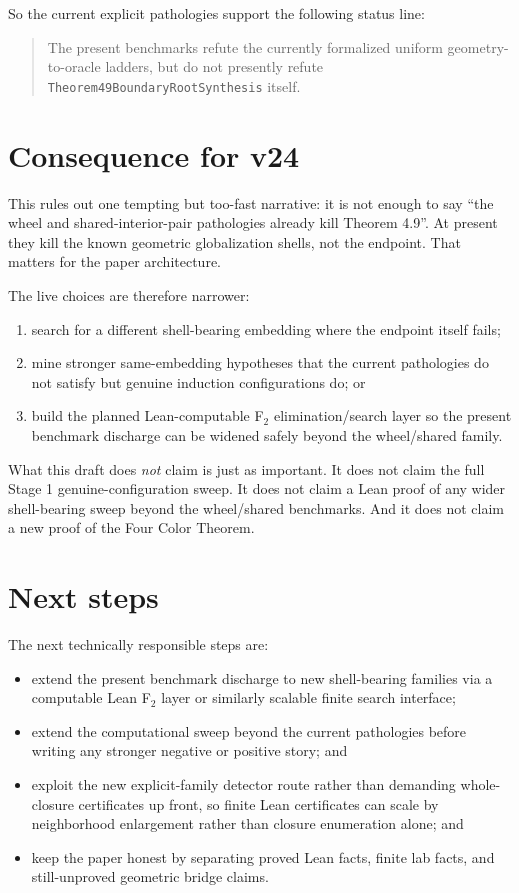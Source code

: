 \documentclass[11pt]{article}
\begin{document}
So the current explicit pathologies support the following status line:
\begin{quote}
The present benchmarks refute the currently formalized uniform geometry-to-oracle
ladders, but do not presently refute
\verb|Theorem49BoundaryRootSynthesis| itself.
\end{quote}

\section{Consequence for v24}

This rules out one tempting but too-fast narrative: it is not enough to say
``the wheel and shared-interior-pair pathologies already kill Theorem 4.9''.
At present they kill the known geometric globalization shells, not the
endpoint.  That matters for the paper architecture.

The live choices are therefore narrower:
\begin{enumerate}[leftmargin=2em]
\item search for a different shell-bearing embedding where the endpoint itself
  fails;
\item mine stronger same-embedding hypotheses that the current pathologies do
  not satisfy but genuine induction configurations do; or
\item build the planned Lean-computable F$_2$ elimination/search layer so the
  present benchmark discharge can be widened safely beyond the wheel/shared
  family.
\end{enumerate}

What this draft does \emph{not} claim is just as important.  It does not claim
the full Stage 1 genuine-configuration sweep.  It does not claim a Lean proof
of any wider shell-bearing sweep beyond the wheel/shared benchmarks.  And it
does not claim a new proof of the Four Color Theorem.

\section{Next steps}

The next technically responsible steps are:
\begin{itemize}[leftmargin=2em]
\item extend the present benchmark discharge to new shell-bearing families via
  a computable Lean F$_2$ layer or similarly scalable finite search interface;
\item extend the computational sweep beyond the current pathologies before
  writing any stronger negative or positive story; and
\item exploit the new explicit-family detector route rather than demanding
  whole-closure certificates up front, so finite Lean certificates can scale
  by neighborhood enlargement rather than closure enumeration alone; and
\item keep the paper honest by separating proved Lean facts, finite lab facts,
  and still-unproved geometric bridge claims.
\end{itemize}
\end{document}
